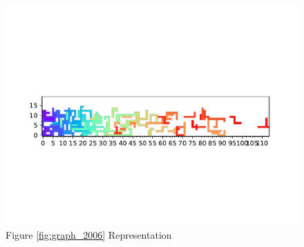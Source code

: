 \documentclass{standalone}
\begin{document}
\begin{figure}[!htb]
	\caption{Figure \ref{fig:graph_2006} Representation}
	\label{fig:picture_2006}
	\includegraphics[width=\textwidth]{../graphs/picture/2006.pdf}
\end{figure}
\end{document}
